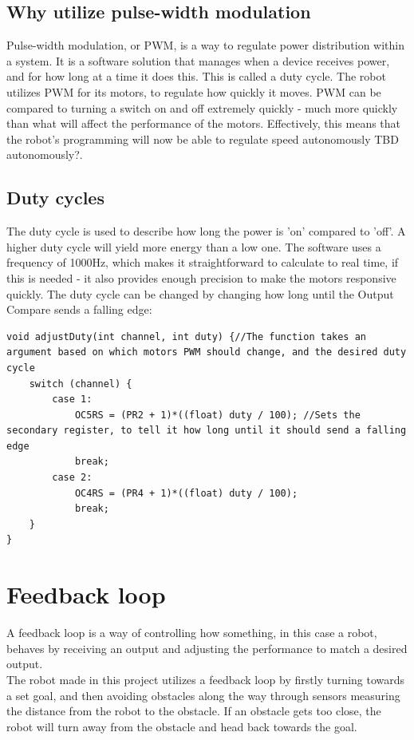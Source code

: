 \subsection {Why utilize pulse-width modulation}

Pulse-width modulation, or PWM, is a way to regulate power distribution within a system. It is a software solution that manages when a device receives power, and for how long at a time it does this. This is called a duty cycle. The robot utilizes PWM for its motors, to regulate how quickly it moves. PWM can be compared to turning a switch on and off extremely quickly - much more quickly than what will affect the performance of the motors. Effectively, this means that the robot's programming will now be able to regulate speed autonomously TBD autonomously?. 
 
\subsection {Duty cycles}

The duty cycle is used to describe how long the power is 'on' compared to 'off'. A higher duty cycle will yield more energy than a low one. The software uses a frequency of 1000Hz, which makes it straightforward to calculate to real time, if this is needed - it also provides enough precision to make the motors responsive quickly.
The duty cycle can be changed by changing how long until the Output Compare sends a falling edge:

\begin{lstlisting}
void adjustDuty(int channel, int duty) {//The function takes an argument based on which motors PWM should change, and the desired duty cycle
    switch (channel) { 
        case 1:
            OC5RS = (PR2 + 1)*((float) duty / 100); //Sets the secondary register, to tell it how long until it should send a falling edge
            break;
        case 2:
            OC4RS = (PR4 + 1)*((float) duty / 100);
            break;
    }
}
\end{lstlisting}

\section{Feedback loop}
A feedback loop is a way of controlling how something, in this case a robot, behaves by receiving an output and adjusting the performance to match a desired output.\\
The robot made in this project utilizes a feedback loop by firstly turning towards a set goal, and then avoiding obstacles along the way through sensors measuring the distance from the robot to the obstacle. If an obstacle gets too close, the robot will turn away from the obstacle and head back towards the goal.
